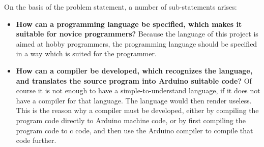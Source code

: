 On the basis of the problem statement, a number of sub-statements arises:
\begin{itemize}
	\item \textbf{How can a programming language be specified, which makes it suitable for novice programmers?} Because the language of this project is aimed at hobby programmers, the programming language should be specified in a way which is suited for the programmer.
	\item \textbf{How can a compiler be developed, which recognizes the language, and translates the source program into Arduino suitable code?} Of course it is not enough to have a simple-to-understand language, if it does not have a compiler for that language. The language would then render useless. This is the reason why a compiler must be developed, either by compiling the program code directly to Arduino machine code, or by first compiling the program code to c code, and then use the Arduino compiler to compile that code further. 
\end{itemize}